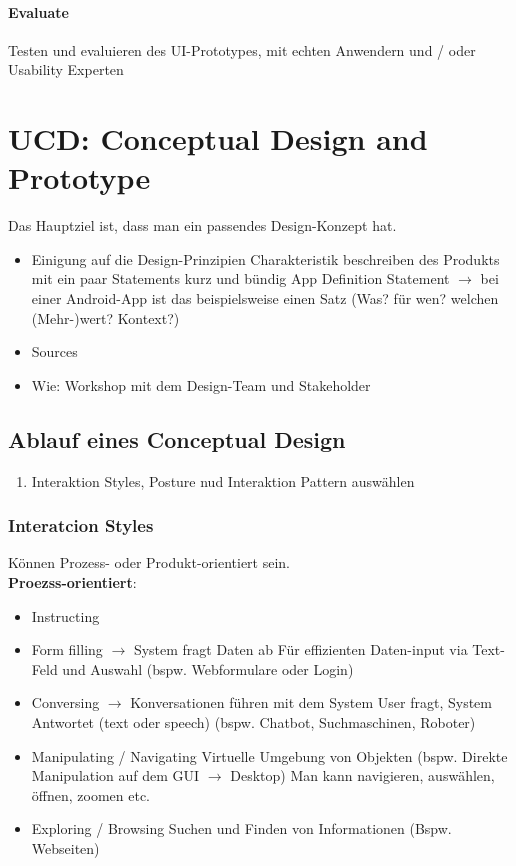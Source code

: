 \documentclass{report}
\theoremstyle{definition}
\theoremstyle{example}
\begin{document}
\subsubsection{Evaluate}
Testen und evaluieren des UI-Prototypes, mit echten Anwendern und / oder Usability Experten

\chapter{UCD: Conceptual Design and Prototype}
Das Hauptziel ist, dass man ein passendes Design-Konzept hat.\\
\begin{itemize}
   \item Einigung auf die Design-Prinzipien
   \subitem Charakteristik beschreiben des Produkts mit ein paar Statements
   \subitem kurz und bündig 
   \subitem App Definition Statement $\rightarrow$ bei einer Android-App ist das beispielsweise einen Satz (Was? für wen? welchen (Mehr-)wert? Kontext?)
   \item Sources
   \item Wie: Workshop mit dem Design-Team und Stakeholder
\end{itemize}

\section{Ablauf eines Conceptual Design}
\begin{enumerate}
   \item Interaktion Styles, Posture nud Interaktion Pattern auswählen
\end{enumerate}

\subsection{Interatcion Styles}
Können Prozess- oder Produkt-orientiert sein.\\
\textbf{Proezss-orientiert}:
\begin{itemize}
   \item Instructing
   \item Form filling $\rightarrow$ System fragt Daten ab
   \subitem Für effizienten Daten-input via Text-Feld und Auswahl (bspw. Webformulare oder Login)
   \item Conversing $\rightarrow$ Konversationen führen mit dem System
   \subitem User fragt, System Antwortet (text oder speech) (bspw. Chatbot, Suchmaschinen, Roboter)
   \item Manipulating / Navigating
   \subitem Virtuelle Umgebung von Objekten (bspw. Direkte Manipulation auf dem GUI $\rightarrow$ Desktop)
   \subitem Man kann navigieren, auswählen, öffnen, zoomen etc.
   \item Exploring / Browsing 
   \subitem Suchen und Finden von Informationen (Bspw. Webseiten)
\end{itemize}
\end{document}
